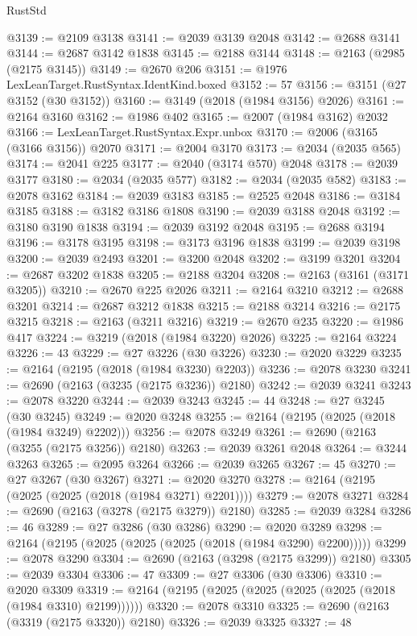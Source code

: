 \begin{lexlean}{RustStd}
\begin{coremodule}
@3139 := @2109 @3138
@3141 := @2039 @3139 @2048
@3142 := @2688 @3141
@3144 := @2687 @3142 @1838
@3145 := @2188 @3144
@3148 := @2163 (@2985 (@2175 @3145))
@3149 := @2670 @206
@3151 := @1976 LexLeanTarget.RustSyntax.IdentKind.boxed
@3152 := 57
@3156 := @3151 (@27 @3152 (@30 @3152))
@3160 := @3149 (@2018 (@1984 @3156) @2026)
@3161 := @2164 @3160
@3162 := @1986 @402
@3165 := @2007 (@1984 @3162) @2032
@3166 := LexLeanTarget.RustSyntax.Expr.unbox
@3170 := @2006 (@3165 (@3166 @3156)) @2070
@3171 := @2004 @3170
@3173 := @2034 (@2035 @565)
@3174 := @2041 @225
@3177 := @2040 (@3174 @570) @2048
@3178 := @2039 @3177
@3180 := @2034 (@2035 @577)
@3182 := @2034 (@2035 @582)
@3183 := @2078 @3162
@3184 := @2039 @3183
@3185 := @2525 @2048
@3186 := @3184 @3185
@3188 := @3182 @3186 @1808
@3190 := @2039 @3188 @2048
@3192 := @3180 @3190 @1838
@3194 := @2039 @3192 @2048
@3195 := @2688 @3194
@3196 := @3178 @3195
@3198 := @3173 @3196 @1838
@3199 := @2039 @3198
@3200 := @2039 @2493
@3201 := @3200 @2048
@3202 := @3199 @3201
@3204 := @2687 @3202 @1838
@3205 := @2188 @3204
@3208 := @2163 (@3161 (@3171 @3205))
@3210 := @2670 @225 @2026
@3211 := @2164 @3210
@3212 := @2688 @3201
@3214 := @2687 @3212 @1838
@3215 := @2188 @3214
@3216 := @2175 @3215
@3218 := @2163 (@3211 @3216)
@3219 := @2670 @235
@3220 := @1986 @417
@3224 := @3219 (@2018 (@1984 @3220) @2026)
@3225 := @2164 @3224
@3226 := 43
@3229 := @27 @3226 (@30 @3226)
@3230 := @2020 @3229
@3235 := @2164 (@2195 (@2018 (@1984 @3230) @2203))
@3236 := @2078 @3230
@3241 := @2690 (@2163 (@3235 (@2175 @3236)) @2180)
@3242 := @2039 @3241
@3243 := @2078 @3220
@3244 := @2039 @3243
@3245 := 44
@3248 := @27 @3245 (@30 @3245)
@3249 := @2020 @3248
@3255 := @2164 (@2195 (@2025 (@2018 (@1984 @3249) @2202)))
@3256 := @2078 @3249
@3261 := @2690 (@2163 (@3255 (@2175 @3256)) @2180)
@3263 := @2039 @3261 @2048
@3264 := @3244 @3263
@3265 := @2095 @3264
@3266 := @2039 @3265
@3267 := 45
@3270 := @27 @3267 (@30 @3267)
@3271 := @2020 @3270
@3278 := @2164 (@2195 (@2025 (@2025 (@2018 (@1984 @3271) @2201))))
@3279 := @2078 @3271
@3284 := @2690 (@2163 (@3278 (@2175 @3279)) @2180)
@3285 := @2039 @3284
@3286 := 46
@3289 := @27 @3286 (@30 @3286)
@3290 := @2020 @3289
@3298 := @2164 (@2195 (@2025 (@2025 (@2025 (@2018 (@1984 @3290) @2200)))))
@3299 := @2078 @3290
@3304 := @2690 (@2163 (@3298 (@2175 @3299)) @2180)
@3305 := @2039 @3304
@3306 := 47
@3309 := @27 @3306 (@30 @3306)
@3310 := @2020 @3309
@3319 := @2164 (@2195 (@2025 (@2025 (@2025 (@2025 (@2018 (@1984 @3310) @2199))))))
@3320 := @2078 @3310
@3325 := @2690 (@2163 (@3319 (@2175 @3320)) @2180)
@3326 := @2039 @3325
@3327 := 48

\end{coremodule}
\end{lexlean}
